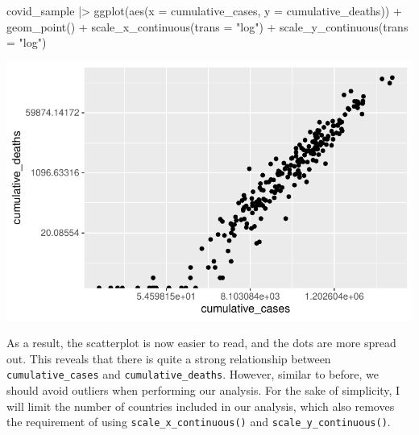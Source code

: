 \documentclass[
  letterpaper,
  DIV=11,
  numbers=noendperiod]{scrreprt}
\newenvironment{Shaded}{\begin{snugshade}}{\end{snugshade}}
\newcommand{\AttributeTok}[1]{\textcolor[rgb]{0.40,0.45,0.13}{#1}}
\newcommand{\FunctionTok}[1]{\textcolor[rgb]{0.28,0.35,0.67}{#1}}
\newcommand{\NormalTok}[1]{\textcolor[rgb]{0.00,0.23,0.31}{#1}}
\newcommand{\SpecialCharTok}[1]{\textcolor[rgb]{0.37,0.37,0.37}{#1}}
\newcommand{\StringTok}[1]{\textcolor[rgb]{0.13,0.47,0.30}{#1}}
\begin{document}
\begin{Shaded}
\begin{Highlighting}[]
\NormalTok{covid\_sample }\SpecialCharTok{|\textgreater{}}
  \FunctionTok{ggplot}\NormalTok{(}\FunctionTok{aes}\NormalTok{(}\AttributeTok{x =}\NormalTok{ cumulative\_cases,}
             \AttributeTok{y =}\NormalTok{ cumulative\_deaths)) }\SpecialCharTok{+}
  \FunctionTok{geom\_point}\NormalTok{() }\SpecialCharTok{+}
  \FunctionTok{scale\_x\_continuous}\NormalTok{(}\AttributeTok{trans =} \StringTok{"log"}\NormalTok{) }\SpecialCharTok{+}
  \FunctionTok{scale\_y\_continuous}\NormalTok{(}\AttributeTok{trans =} \StringTok{"log"}\NormalTok{)}
\end{Highlighting}
\end{Shaded}

\includegraphics{13_regressions_files/figure-latex/fitting-model-by-hand-step-two-1.pdf}

As a result, the scatterplot is now easier to read, and the dots are
more spread out. This reveals that there is quite a strong relationship
between \texttt{cumulative\_cases} and \texttt{cumulative\_deaths}.
However, similar to before, we should avoid outliers when performing our
analysis. For the sake of simplicity, I will limit the number of
countries included in our analysis, which also removes the requirement
of using \texttt{scale\_x\_continuous()} and
\texttt{scale\_y\_continuous()}.
\end{document}
